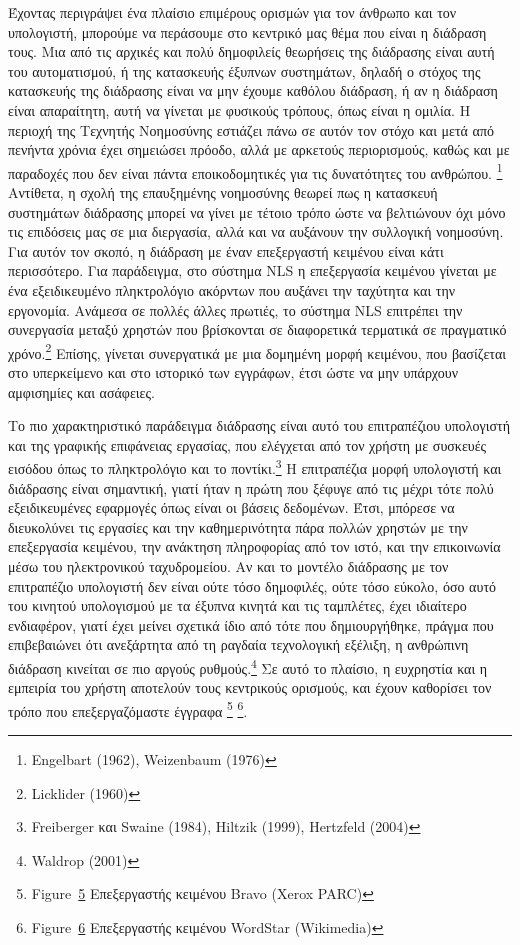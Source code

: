 \documentclass[
]{article}
\begin{document}
Έχοντας περιγράψει ένα πλαίσιο επιμέρους ορισμών για τον άνθρωπο και τον
υπολογιστή, μπορούμε να περάσουμε στο κεντρικό μας θέμα που είναι η
διάδραση τους. Μια από τις αρχικές και πολύ δημοφιλείς θεωρήσεις της
διάδρασης είναι αυτή του αυτοματισμού, ή της κατασκευής έξυπνων
συστημάτων, δηλαδή ο στόχος της κατασκευής της διάδρασης είναι να μην
έχουμε καθόλου διάδραση, ή αν η διάδραση είναι απαραίτητη, αυτή να
γίνεται με φυσικούς τρόπους, όπως είναι η ομιλία. Η περιοχή της Τεχνητής
Νοημοσύνης εστιάζει πάνω σε αυτόν τον στόχο και μετά από πενήντα χρόνια
έχει σημειώσει πρόοδο, αλλά με αρκετούς περιορισμούς, καθώς και με
παραδοχές που δεν είναι πάντα εποικοδομητικές για τις δυνατότητες του
ανθρώπου. \footnote{Engelbart (1962), Weizenbaum (1976)} Αντίθετα, η
σχολή της επαυξημένης νοημοσύνης θεωρεί πως η κατασκευή συστημάτων
διάδρασης μπορεί να γίνει με τέτοιο τρόπο ώστε να βελτιώνουν όχι μόνο
τις επιδόσεις μας σε μια διεργασία, αλλά και να αυξάνουν την συλλογική
νοημοσύνη. Για αυτόν τον σκοπό, η διάδραση με έναν επεξεργαστή κειμένου
είναι κάτι περισσότερο. Για παράδειγμα, στο σύστημα NLS η επεξεργασία
κειμένου γίνεται με ένα εξειδικευμένο πληκτρολόγιο ακόρντων που αυξάνει
την ταχύτητα και την εργονομία. Ανάμεσα σε πολλές άλλες πρωτιές, το
σύστημα NLS επιτρέπει την συνεργασία μεταξύ χρηστών που βρίσκονται σε
διαφορετικά τερματικά σε πραγματικό χρόνο.\footnote{Licklider (1960)}
Επίσης, γίνεται συνεργατικά με μια δομημένη μορφή κειμένου, που
βασίζεται στο υπερκείμενο και στο ιστορικό των εγγράφων, έτσι ώστε να
μην υπάρχουν αμφισημίες και ασάφειες.

Το πιο χαρακτηριστικό παράδειγμα διάδρασης είναι αυτό του επιτραπέζιου
υπολογιστή και της γραφικής επιφάνειας εργασίας, που ελέγχεται από τον
χρήστη με συσκευές εισόδου όπως το πληκτρολόγιο και το
ποντίκι.\footnote{Freiberger και Swaine (1984), Hiltzik (1999),
  Hertzfeld (2004)} Η επιτραπέζια μορφή υπολογιστή και διάδρασης είναι
σημαντική, γιατί ήταν η πρώτη που ξέφυγε από τις μέχρι τότε πολύ
εξειδικευμένες εφαρμογές όπως είναι οι βάσεις δεδομένων. Έτσι, μπόρεσε
να διευκολύνει τις εργασίες και την καθημερινότητα πάρα πολλών χρηστών
με την επεξεργασία κειμένου, την ανάκτηση πληροφορίας από τον ιστό, και
την επικοινωνία μέσω του ηλεκτρονικού ταχυδρομείου. Αν και το μοντέλο
διάδρασης με τον επιτραπέζιο υπολογιστή δεν είναι ούτε τόσο δημοφιλές,
ούτε τόσο εύκολο, όσο αυτό του κινητού υπολογισμού με τα έξυπνα κινητά
και τις ταμπλέτες, έχει ιδιαίτερο ενδιαφέρον, γιατί έχει μείνει σχετικά
ίδιο από τότε που δημιουργήθηκε, πράγμα που επιβεβαιώνει ότι ανεξάρτητα
από τη ραγδαία τεχνολογική εξέλιξη, η ανθρώπινη διάδραση κινείται σε πιο
αργούς ρυθμούς.\footnote{Waldrop (2001)} Σε αυτό το πλαίσιο, η ευχρηστία
και η εμπειρία του χρήστη αποτελούν τους κεντρικούς ορισμούς, και έχουν
καθορίσει τον τρόπο που επεξεργαζόμαστε έγγραφα \footnote{Figure~\protect\hyperlink{fig:xerox-bravo}{5}
  Επεξεργαστής κειμένου Bravo (Xerox PARC)} \footnote{Figure~\protect\hyperlink{fig:wordstar-editor}{6}
  Επεξεργαστής κειμένου WordStar (Wikimedia)}.
\end{document}
